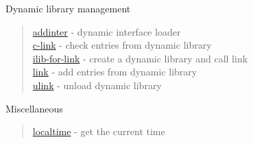 Dynamic library management
\begin{quote}
\noindent 
\hyperlink{addinter}{addinter} - dynamic interface loader\\
\hyperlink{c_link}{c-link} - check entries from dynamic library \\
\hyperlink{ilib_for_link}{ilib-for-link} - create a dynamic library and call link \\
\hyperlink{link}{link} - add entries from dynamic library \\
\hyperlink{ulink}{ulink} - unload dynamic library \\
\end{quote}

Miscellaneous 
\begin{quote}
\noindent 
\hyperlink{localtime}{localtime} - {get the current time}
\end{quote}




 
  
  

 

 
 

 
 
 

